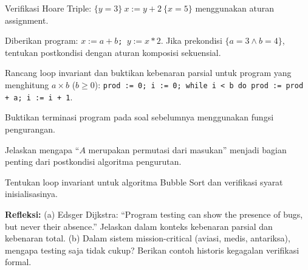 \documentclass[../main]{subfiles}
\begin{document}

\begin{latihan}
  \item Verifikasi Hoare Triple: $\{y = 3\}\ x := y + 2\ \{x = 5\}$ menggunakan aturan assignment.
  \item Diberikan program: \texttt{$x := a + b$; $y := x * 2$}. Jika prekondisi $\{a = 3 \wedge b = 4\}$, tentukan postkondisi dengan aturan komposisi sekuensial.
  \item Rancang loop invariant dan buktikan kebenaran parsial untuk program yang menghitung $a \times b$ ($b \geq 0$): \texttt{prod := 0; i := 0; while i < b do prod := prod + a; i := i + 1}.
  \item Buktikan terminasi program pada soal sebelumnya menggunakan fungsi pengurangan.
  \item Jelaskan mengapa ``$A$ merupakan permutasi dari masukan'' menjadi bagian penting dari postkondisi algoritma pengurutan.
  \item Tentukan loop invariant untuk algoritma Bubble Sort dan verifikasi syarat inisialisasinya.
  \item \textbf{Refleksi:} (a) Edsger Dijkstra: ``Program testing can show the presence of bugs, but never their absence.'' Jelaskan dalam konteks kebenaran parsial dan kebenaran total. (b) Dalam sistem mission-critical (aviasi, medis, antariksa), mengapa testing saja tidak cukup? Berikan contoh historis kegagalan verifikasi formal.
\end{latihan}

\end{document}
